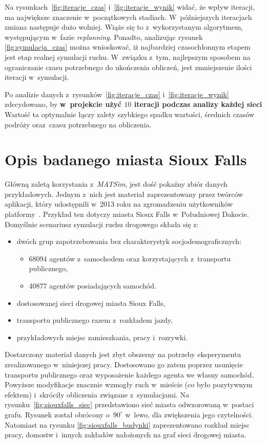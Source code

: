 \documentclass[twoside,12pt]{report}
\begin{document}
Na rysunkach~\ref{fig:iteracje_czas} i~\ref{fig:iteracje_wynik} widać, że wpływ iteracji, ma największe znaczenie w~początkowych stadiach. W~późniejszych iteracjach zmiana następuje dużo wolniej. Wiąże się to z~wykorzystanym algorytmem, występującym w~fazie \textit{replanning}. Ponadto, analizując rysunek \ref{fig:symulacja_czas} można wnioskować, iż najbardziej czasochłonnym etapem jest etap realnej symulacji ruchu. W~związku z~tym, najlepszym sposobem na ograniczanie czasu potrzebnego do ukończenia obliczeń, jest zmniejszenie ilości iteracji w~symulacji.

Po analizie danych z~rysunków~\ref{fig:iteracje_czas} i~\ref{fig:iteracje_wynik} zdecydowano, by \textbf{w~projekcie użyć $10$ iteracji podczas analizy każdej sieci} Wartość ta optymalnie łączy zalety szybkiego spadku wartości, średnich czasów podróży oraz~czasu potrzebnego na obliczenia. 

\section{Opis badanego miasta Sioux Falls}\label{rozdz.opis_siouxfalls}

Główną zaletą korzystania z~\textit{MATSim}, jest dość pokaźny zbiór danych przykładowych. Jednym z~nich jest materiał zaprezentowany przez twórców aplikacji, który udostępnili w~2013 roku na zgromadzeniu użytkowników platformy~\cite{siux}. Przykład ten dotyczy miasta Sioux Falls w~Południowej Dakocie. Domyślnie scenariusz symulacji ruchu drogowego składa się z:

\begin{itemize}
\item dwóch grup zapotrzebowania bez charakterystyk socjodemograficznych:
\begin{itemize}
\item 68094 agentów z~samochodem oraz korzystających z~transportu publicznego,
\item 40877 agentów posiadających samochód.
\end{itemize}
\item dostosowanej sieci drogowej miasta Sioux Falls,
\item transportu publicznego razem z~rozkładem jazdy,
\item przykładowych miejsc zamieszkania, pracy i~rozrywki.
\end{itemize}

Dostarczony materiał danych jest zbyt obszerny na potrzeby eksperymentu zrealizowanego w~niniejszej pracy. Dostosowano go zatem poprzez usunięcie transportu publicznego oraz wyposażenie każdego agenta we własny samochód. Powyższe modyfikacje znacznie wzmogły ruch w~mieście (co było pozytywnym efektem) i~skróciły obliczenia związane z~symulacjami. Na rysunku~\ref{fig:siouxfalls_siec} przedstawiono sieć miasta odwzorowaną w~postaci grafu. Rysunek został obrócony o~$90^{\circ}$ w~lewo, dla zwiększenia jego czytelności. Natomiast na rysunku \ref{fig:siouxfalls_budynki} zaprezentowano rozkład miejsc pracy, domostw i~innych zakładów nałożonych na graf sieci drogowej miasta.
\end{document}
